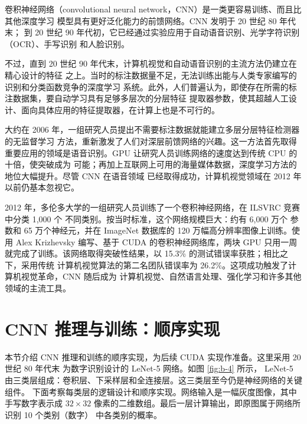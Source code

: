 卷积神经网络（convolutional neural network，CNN）是一类更容易训练、而且比其他深度学习
模型具有更好泛化能力的前馈网络。CNN 发明于 20 世纪 80 年代末\cite{appb-lecun-document}；
到 20 世纪 90 年代初，它已经通过实验应用于自动语音识别、光学字符识别（OCR）、手写识别
和人脸识别\cite{appb-lecun-handwritten}。

不过，直到 20 世纪 90 年代末，计算机视觉和自动语音识别的主流方法仍建立在精心设计的特征
之上。当时的标注数据量不足，无法训练出能与人类专家编写的识别和分类函数竞争的深度学习
系统。此外，人们普遍认为，即使存在所需的标注数据集，要自动学习具有足够多层次的分层特征
提取器参数，使其超越人工设计、面向具体应用的特征提取器，在计算上也是不可行的。

大约在 2006 年，一组研究人员提出不需要标注数据就能建立多层分层特征检测器的无监督学习
方法，重新激发了人们对深层前馈网络的兴趣\cite{appb-hinton,appb-raina}。这一方法首先取得
重要应用的领域是语音识别。GPU 让研究人员训练网络的速度达到传统 CPU 的十倍，使突破成为
可能；再加上互联网上可用的海量媒体数据，深度学习方法的地位大幅提升。尽管 CNN 在语音领域
已经取得成功，计算机视觉领域在 2012 年以前仍基本忽视它。

2012 年，多伦多大学的一组研究人员训练了一个卷积神经网络，在 ILSVRC 竞赛中分类 1,000 个
不同类别\cite{appb-krizhevsky-imagenet}。按当时标准，这个网络规模巨大：约有 6,000 万个
参数和 65 万个神经元，并在 ImageNet 数据库的 120 万幅高分辨率图像上训练。使用 Alex
Krizhevsky 编写、基于 CUDA 的卷积神经网络库\cite{appb-cudaconvnet}，两块 GPU 只用一周
就完成了训练。该网络取得突破性结果，以 15.3\% 的测试错误率获胜；相比之下，采用传统
计算机视觉算法的第二名团队错误率为 26.2\%。这项成功触发了计算机视觉革命，CNN 随后成为
计算机视觉、自然语言处理、强化学习和许多其他领域的主流工具。

\section{CNN 推理与训练：顺序实现}
\label{sec:appb-cnn-sequential}

本节介绍 CNN 推理和训练的顺序实现，为后续 CUDA 实现作准备。这里采用 20 世纪 80 年代末
为数字识别设计的 LeNet-5 网络\cite{appb-lecun-handwritten}。如图 \ref{fig:b-4} 所示，
LeNet-5 由三类层组成：卷积层、下采样层和全连接层。这三类层至今仍是神经网络的关键组件。
下面考察每类层的逻辑设计和顺序实现。网络输入是一幅灰度图像，其中手写数字表示成
$32\times32$ 像素的二维数组。最后一层计算输出，即原图属于网络所识别 10 个类别（数字）
中各类别的概率。


